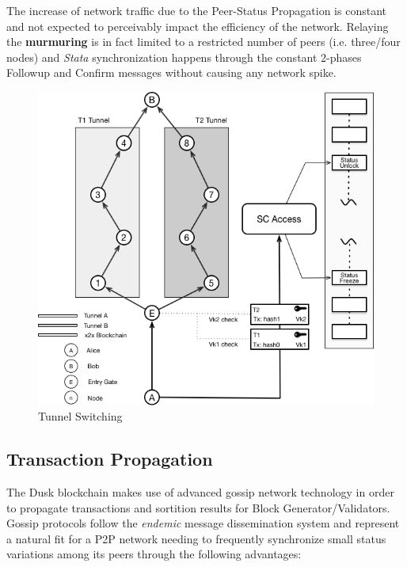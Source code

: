 The increase of network traffic due to the Peer-Status Propagation is
constant and not expected to perceivably impact the efficiency of the
network. Relaying the \textbf{murmuring} is in fact limited to a
restricted number of peers (i.e. three/four nodes) and \emph{Stata}
synchronization happens through the constant 2-phases Followup and
Confirm messages without causing any network spike.
\begin{figure}
\includegraphics[scale=0.5]{tunnelswitch}
\caption{Tunnel Switching}
\label{tunnelswitch}
\end{figure}
\subsection{Transaction Propagation}

The \textrm{Dusk} blockchain makes use of advanced gossip network technology
in order to propagate transactions and sortition results for Block
Generator/Validators. Gossip protocols follow the \emph{endemic} message
dissemination system and represent a natural fit for a P2P network needing to frequently synchronize small status variations among its peers
through the following advantages:

